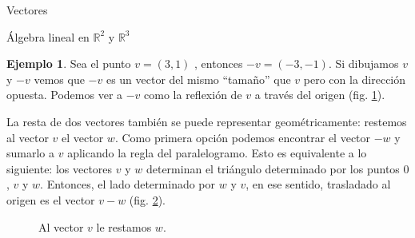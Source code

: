 \documentclass[a4paper,12pt,twoside,spanish,reqno]{amsbook}
\theoremstyle{definition}
\newtheorem{ejemplo}{Ejemplo}[section]
\theoremstyle{remark}
\newcommand{\R}{\mathbb R}
\begin{document}
\begin{chapter}{Vectores}
\begin{section}{Álgebra lineal en $\R^2$ y $\R^3$}
    
    \begin{ejemplo} Sea el punto $v =(3, 1)$ , entonces $-v = (- 3, - 1)$. Si dibujamos $v$ y $-v$ vemos que $-v$ es un vector del mismo ``tamaño'' que $v$ pero con la dirección opuesta. Podemos ver a $-v$ como la reflexión de $v$ a través del origen (fig. \ref{fig-vector-opuesto}). 
    \begin{figure}[h]
        \caption{\;}\label{fig-vector-opuesto}
    \end{figure}
    \end{ejemplo}




    La resta de dos vectores también se puede representar geométricamente: restemos  al vector $v$ el vector $w$. Como primera opción podemos encontrar el  vector $-w$ y sumarlo  a $v$ aplicando la regla del paralelogramo. Esto es equivalente a lo siguiente: los vectores $v$ y $w$ determinan el triángulo determinado por los puntos $0$, $v$ y $w$. Entonces,  el lado determinado por $w$ y $v$,  en ese sentido, trasladado al origen es el vector $v-w$  (fig. \ref{fig-resta-de-vectores}). 
    \begin{figure}[h]
        \caption{Al  vector $v$ le restamos $w$.}\label{fig-resta-de-vectores}
    \end{figure}
    

\end{section}
\end{chapter}
\end{document}
